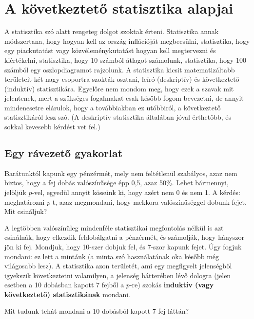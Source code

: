 \documentclass[magyar,]{book}
\begin{document}
\hypertarget{a-kuxf6vetkeztetux151-statisztika-alapjai}{%
\chapter{A következtető statisztika alapjai}\label{a-kuxf6vetkeztetux151-statisztika-alapjai}}

A statisztika szó alatt rengeteg dolgot szoktak érteni. Statisztika annak módszertana, hogy hogyan kell az ország inflációját megbecsülni, statisztika, hogy egy piackutatást vagy közvéleménykutatást hogyan kell megtervezni és kiértékelni, statisztika, hogy 10 számból átlagot számolunk, statisztika, hogy 100 számból egy oszlopdiagramot rajzolunk. A statisztika kicsit matematizáltabb területeit két nagy csoportra szokták osztani, leíró (deskriptív) és következtető (induktív) statisztikára. Egyelőre nem mondom meg, hogy ezek a szavak mit jelentenek, mert a szükséges fogalmakat csak később fogom bevezetni, de annyit mindenesetre elárulok, hogy a továbbiakban ez utóbbiról, a következtető statisztikáról lesz szó. (A deskriptív statisztika általában jóval érthetőbb, és sokkal kevesebb kérdést vet fel.)

\hypertarget{egy-ruxe1vezetux151-gyakorlat}{%
\section{Egy rávezető gyakorlat}\label{egy-ruxe1vezetux151-gyakorlat}}

Barátunktól kapunk egy pénzérmét, mely nem feltétlenül szabályos, azaz nem biztos, hogy a fej dobás valószínűsége épp 0,5, azaz 50\%. Lehet bármennyi, jelöljük \(p\)-vel, egyedül annyit kössünk ki, hogy azért nem 0 és nem 1. A kérdés: meghatározni \(p\)-t, azaz megmondani, hogy mekkora valószínűséggel dobunk fejet. Mit csináljuk?

A legtöbben valószínűleg mindenféle statisztikai megfontolás nélkül is azt csinálnák, hogy elkezdik feldobálgatni a pénzérmét, és számolják, hogy hányszor jön ki fej. Mondjuk, hogy 10-szer dobjuk fel, és 7-szor kapunk fejet. Úgy fogjuk mondani: ez lett a mintánk (a minta szó használatának oka később még világosabb lesz). A statisztika azon területét, ami egy megfigyelt jelenségből igyekszik következtetni valamilyen, a jelenség hátterében lévő dologra (jelen esetben a 10 dobásban kapott 7 fejből a \(p\)-re) szokás \textbf{induktív (vagy következtető) statisztikának} mondani.

Mit tudunk tehát mondani a 10 dobásból kapott 7 fej láttán?
\end{document}
